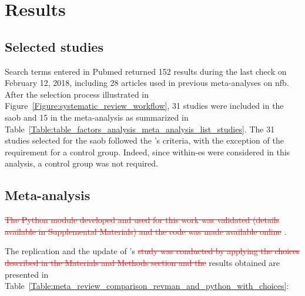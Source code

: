 


\section{Results}

\subsection{Selected studies}

Search terms entered in Pubmed returned 152 results during the last check on February 12, 2018, including 28 
articles used in previous meta-analyses on \gls{nfb}. After the selection process illustrated 
in Figure~\ref{Figure:systematic_review_workflow}, 31 studies were included in the \gls{saob} and 15 in the meta-analysis 
as summarized in Table~\ref{Table:table_factors_analysis_meta_analysis_list_studies}. The 31 studies selected for the \gls{saob} 
followed the \citeauthor{Cortese2016}'s criteria, with the exception of the requirement for a control group. 
Indeed, since within-\gls{es} were considered in this analysis, a control group was not required.

\subsection{Meta-analysis}

\textcolor{red}{\sout{The Python module developed and used for this work was validated (details available in Supplemental Materials) 
and the code was made available online}} \citep{Bussalb2018}.

The replication and the update of \citeauthor{Cortese2016}'s \textcolor{red}{\sout{study was conducted by applying the choices described 
in the Materials and Methods section and the}} results obtained are presented 
in Table~\ref{Table:meta_review_comparison_revman_and_python_with_choices}:

